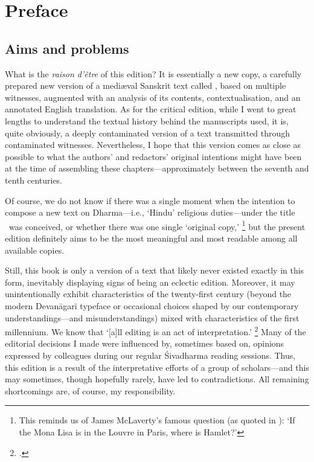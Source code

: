\chapter*{Preface}

\section*{Aims and problems}
\frenchspacing

\noindent
What is the \textit{raison d'\^etre} of this edition? 
It is essentially a new copy, a carefully prepared new version
of a medi\ae val Sanskrit text called \Vss, based on multiple witnesses,
augmented with an analysis of its contents,
contextualisation, and an annotated English translation.
As for the critical edition, while I went to great 
lengths to understand the textual history behind 
the manuscripts used, it is, quite obviously, a deeply contaminated 
version of a text transmitted through contaminated witnesses.
Nevertheless, I hope that this version comes as 
close as possible to what the authors' and redactors'
original intentions might have been at the time of assembling
these chapters---approximately between the seventh and tenth centuries.

Of course, we do not know if there was a single moment
when the intention to compose a new text on Dharma---i.e., `Hindu' religious duties---under
the title \Vss\ was conceived, or whether there was one single `original copy,'%
		\footnote{This reminds us of James McLaverty's famous question (as quoted in
   				  ):
                 `If the Mona Lisa is in the Louvre in Paris, 	
                 where is Hamlet?'}
but the present edition definitely aims to be the most meaningful and
most readable among all available copies.

Still, this book is only a
version of a text that likely never existed exactly 
in this form, inevitably displaying
signs of being an eclectic edition. 
Moreover, it may unintentionally exhibit 
characteristics of the twenty-first century 
(beyond the modern Devanāgarī typeface or occasional choices\linebreak
shaped by our contemporary understandings---and misunderstandings)\linebreak
mixed with characteristics of the first millennium.
We know that `[a]ll editing is an act of interpretation.'%
		\footnote{.}
Many of the editorial decisions I made were influenced by,
sometimes based on, opinions expressed by colleagues during our
regular Śivadharma reading sessions. Thus, this edition is a result
of the interpretative efforts of a group of scholars---and
this may sometimes, though hopefully rarely, have led to contradictions.
All remaining shortcomings are, of course, my responsibility.


